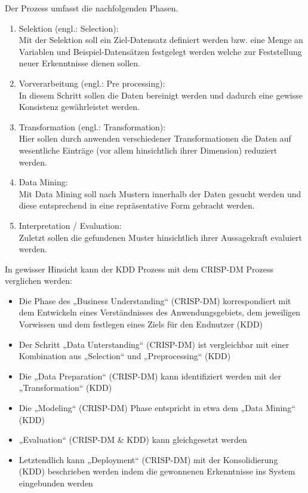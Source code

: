 Der Prozess umfasst die nachfolgenden Phasen.
\begin{enumerate}
  \item Selektion (engl.: Selection): \\
  Mit der Selektion soll ein Ziel-Datensatz definiert werden bzw. eine Menge an
  Variablen und Beispiel-Datensätzen festgelegt werden welche zur Feststellung
  neuer Erkenntnisse dienen sollen.
  \item Vorverarbeitung (engl.: Pre processing): \\
  In diesem Schritt sollen die Daten bereinigt werden und dadurch eine gewisse
  Konsistenz gewährleistet werden.
  \item Transformation (engl.: Transformation):  \\
  Hier sollen durch anwenden verschiedener Transformationen die Daten auf
  wesentliche Einträge (vor allem hinsichtlich ihrer Dimension) reduziert werden.
  \item Data Mining:  \\
  Mit Data Mining soll nach Mustern innerhalb der Daten gesucht werden und diese
  entsprechend in eine repräsentative Form gebracht werden.
  \item Interpretation / Evaluation:  \\
  Zuletzt sollen die gefundenen Muster hinsichtlich ihrer Aussagekraft evaluiert werden.
\end{enumerate}

In gewisser Hinsicht kann der KDD Prozess mit dem CRISP-DM Prozess verglichen werden:
\begin{itemize}
  \item Die Phase des „Business Understanding“ (CRISP-DM) korrespondiert mit dem
  Entwickeln eines Verständnisses des Anwendungsgebiets, dem jeweiligen
  Vorwissen und dem festlegen eines Ziels für den Endnutzer (KDD)
  \item Der Schritt „Data Unterstanding“ (CRISP-DM) ist vergleichbar mit einer
  Kombination aus „Selection“ und „Preprocessing“ (KDD)
  \item Die „Data Preparation“ (CRISP-DM) kann identifiziert werden mit der
  „Transformation“ (KDD)
  \item Die „Modeling“ (CRISP-DM) Phase entspricht in etwa dem „Data Mining“ (KDD)
  \item „Evaluation“ (CRISP-DM & KDD) kann gleichgesetzt werden
  \item Letztendlich kann „Deployment“ (CRISP-DM) mit der Konsolidierung (KDD)
  beschrieben werden indem die gewonnenen Erkenntnisse ins System eingebunden
  werden
\end{itemize}

